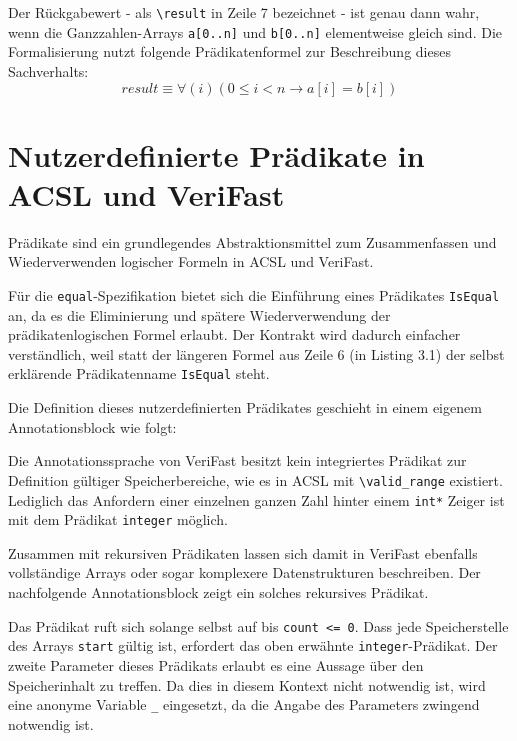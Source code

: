 Der Rückgabewert - als \lstinline{\result} in Zeile 7 bezeichnet - ist genau dann wahr, wenn die Ganzzahlen-Arrays 
\lstinline{a[0..n]} und \lstinline{b[0..n]} elementweise gleich sind. Die Formalisierung nutzt folgende
Prädikatenformel zur Beschreibung dieses Sachverhalts:
\[result \equiv \forall(i) (0 \leq i < n \rightarrow a[i] = b[i])\]

\section{Nutzerdefinierte Prädikate in ACSL und VeriFast}
\label{sec:design-by-contract:predicates}

Prädikate sind ein grundlegendes Abstraktionsmittel zum Zusammenfassen und Wiederverwenden logischer
Formeln in ACSL und VeriFast.

Für die \texttt{equal}-Spezifikation bietet sich die Einführung eines Prädikates \texttt{IsEqual} an,
da es die Eliminierung und spätere Wiederverwendung der prädikatenlogischen Formel erlaubt. Der Kontrakt
wird dadurch einfacher verständlich, weil statt der längeren Formel aus Zeile 6 (in Listing 3.1) der selbst erklärende
Prädikatenname \texttt{IsEqual} steht.



Die Definition dieses nutzerdefinierten Prädikates geschieht in einem eigenem Annotationsblock wie folgt:



Die Annotationssprache von VeriFast besitzt kein integriertes Prädikat zur Definition gültiger Speicherbereiche,
wie es in ACSL mit \lstinline{\valid_range} existiert. Lediglich das Anfordern einer einzelnen ganzen Zahl hinter
einem \lstinline{int*} Zeiger ist mit dem Prädikat \lstinline{integer} möglich.

Zusammen mit rekursiven Prädikaten lassen sich damit in VeriFast ebenfalls vollständige Arrays oder sogar komplexere
Datenstrukturen beschreiben. Der nachfolgende Annotationsblock zeigt ein solches rekursives Prädikat.



Das Prädikat ruft sich solange selbst auf bis \lstinline{count <= 0}. Dass jede Speicherstelle des Arrays \lstinline{start}
gültig ist, erfordert das oben erwähnte \lstinline{integer}-Prädikat. Der zweite Parameter dieses Prädikats erlaubt es eine
Aussage über den Speicherinhalt zu treffen. Da dies in diesem Kontext nicht notwendig ist, wird eine anonyme Variable
\lstinline{_} eingesetzt, da die Angabe des Parameters zwingend notwendig ist.

